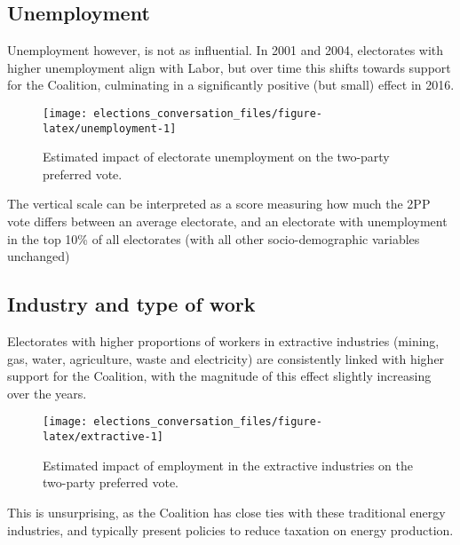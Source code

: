 \documentclass[11pt,a4paper,]{article}
\begin{document}
\hypertarget{unemployment}{%
\subsection*{Unemployment}\label{unemployment}}

Unemployment however, is not as influential. In 2001 and 2004, electorates with higher unemployment align with Labor, but over time this shifts towards support for the Coalition, culminating in a significantly positive (but small) effect in 2016.

\begin{figure}[H]

{\centering \texttt{[image: elections\_conversation\_files/figure-latex/unemployment-1]} 

}

\caption{Estimated impact of electorate unemployment on the two-party preferred vote.}\label{fig:unemployment}
\end{figure}

The vertical scale can be interpreted as a score measuring how much the 2PP vote differs between an average electorate, and an electorate with unemployment in the top 10\% of all electorates (with all other socio-demographic variables unchanged)

\hypertarget{industry-and-type-of-work}{%
\subsection*{Industry and type of work}\label{industry-and-type-of-work}}

Electorates with higher proportions of workers in extractive industries (mining, gas, water, agriculture, waste and electricity) are consistently linked with higher support for the Coalition, with the magnitude of this effect slightly increasing over the years.

\begin{figure}[H]

{\centering \texttt{[image: elections\_conversation\_files/figure-latex/extractive-1]} 

}

\caption{Estimated impact of employment in the extractive industries on the two-party preferred vote.}\label{fig:extractive}
\end{figure}

This is unsurprising, as the Coalition has close ties with these traditional energy industries, and typically present policies to reduce taxation on energy production.
\end{document}
